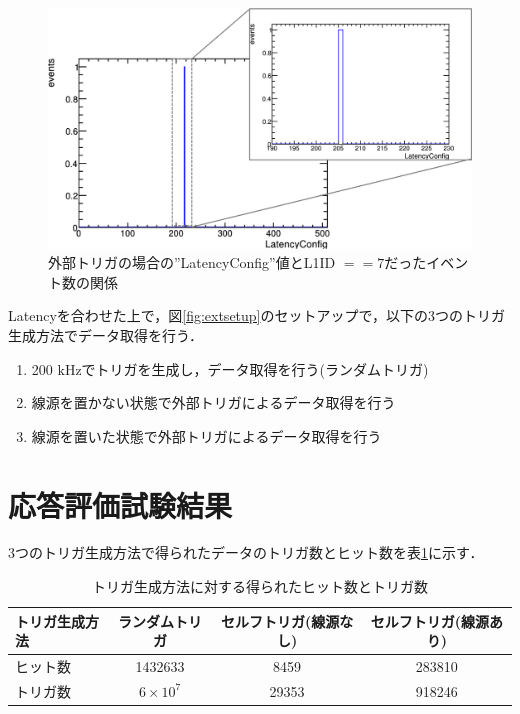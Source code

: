 \begin{figure}[h]
  \centering
  \includegraphics[width=14cm]{./figure/ExtLatencyDist.png}
  \caption{外部トリガの場合の''LatencyConfig''値とL1ID $== 7$だったイベント数の関係}
  \label{fig:exttriglatency}
\end{figure}

Latencyを合わせた上で，図\ref{fig:extsetup}のセットアップで，以下の3つのトリガ生成方法でデータ取得を行う．
\begin{enumerate}
\item 200 $\mathrm{kHz}$でトリガを生成し，データ取得を行う(ランダムトリガ)
\item 線源を置かない状態で外部トリガによるデータ取得を行う
\item 線源を置いた状態で外部トリガによるデータ取得を行う
\end{enumerate}


\section{応答評価試験結果}
\label{sec:extconc}
3つのトリガ生成方法で得られたデータのトリガ数とヒット数を表\ref{tab:ext}に示す．

\begin{table}[h]
  \label{tab:ext}
  \centering
  \caption{トリガ生成方法に対する得られたヒット数とトリガ数}
  \begin{tabular} {l|ccc} \hline 
    トリガ生成方法 & ランダムトリガ & セルフトリガ(線源なし) & セルフトリガ(線源あり) \\ \hline \hline
    ヒット数 & 1432633 & 8459 & 283810 \\
    トリガ数 & $6 \times 10^7$ & 29353 & 918246 \\ \hline
  \end{tabular}
\end{table}

